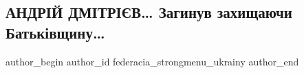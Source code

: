  
 
 
 
 

\subsection{АНДРІЙ ДМІТРІЄВ… Загинув захищаючи Батьківщину…}
\label{sec:05_01_2023.fb.federacia_strongmenu_ukrainy.1.andr_i_dm_tr_v__zag}

\ifcmt
 author_begin
   author_id federacia_strongmenu_ukrainy
 author_end
\fi
